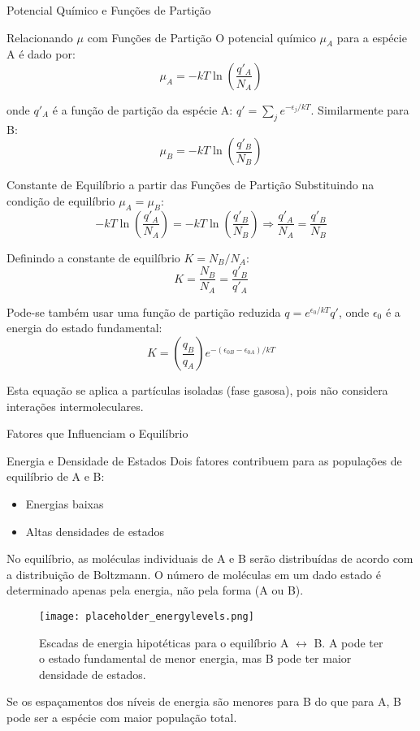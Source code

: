 \documentclass{beamer}
\begin{document}
\begin{frame}{Potencial Químico e Funções de Partição}
    \begin{block}{Relacionando $\mu$ com Funções de Partição}
        O potencial químico $\mu_A$ para a espécie A é dado por:
        $$ \mu_A = -kT \ln\left(\frac{q'_A}{N_A}\right) $$
        
        onde $q'_A$ é a função de partição da espécie A: $q' = \sum_j e^{-\epsilon_j/kT}$.  
        Similarmente para B:
        $$ \mu_B = -kT \ln\left(\frac{q'_B}{N_B}\right) $$
        
    \end{block}
    
    \begin{block}{Constante de Equilíbrio a partir das Funções de Partição}
        Substituindo na condição de equilíbrio $\mu_A = \mu_B$:
        $$ -kT \ln\left(\frac{q'_A}{N_A}\right) = -kT \ln\left(\frac{q'_B}{N_B}\right) \Rightarrow \frac{q'_A}{N_A} = \frac{q'_B}{N_B} $$
        
        Definindo a constante de equilíbrio $K = N_B/N_A$:
        $$ K = \frac{N_B}{N_A} = \frac{q'_B}{q'_A} $$
        
        Pode-se também usar uma função de partição reduzida $q = e^{\epsilon_0/kT}q'$, onde $\epsilon_0$ é a energia do estado fundamental:
        $$ K = \left(\frac{q_B}{q_A}\right) e^{-(\epsilon_{0B} - \epsilon_{0A})/kT} $$
        
        Esta equação se aplica a partículas isoladas (fase gasosa), pois não considera interações intermoleculares. 
    \end{block}
\end{frame}

\begin{frame}{Fatores que Influenciam o Equilíbrio}
    \begin{block}{Energia e Densidade de Estados}
        Dois fatores contribuem para as populações de equilíbrio de A e B:
        \begin{itemize}
            \item Energias baixas 
            \item Altas densidades de estados 
        \end{itemize}
        
        No equilíbrio, as moléculas individuais de A e B serão distribuídas de acordo com a distribuição de Boltzmann.  O número de moléculas em um dado estado é determinado apenas pela energia, não pela forma (A ou B). 
        \begin{figure}
        \centering
        \texttt{[image: placeholder\_energylevels.png]}
        \caption{Escadas de energia hipotéticas para o equilíbrio A $\leftrightarrow$ B. A pode ter o estado fundamental de menor energia, mas B pode ter maior densidade de estados. }
        \end{figure}
        Se os espaçamentos dos níveis de energia são menores para B do que para A, B pode ser a espécie com maior população total. 
    \end{block}
\end{frame}
\end{document}
